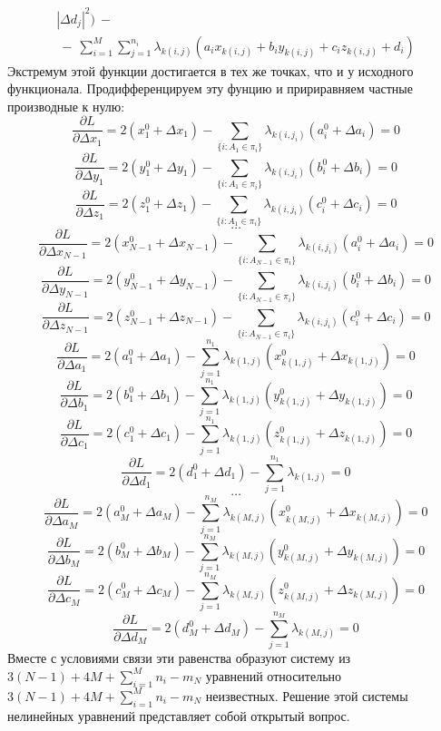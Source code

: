 \documentclass[a4paper,12pt, titlepage]{article}
\begin{document}
\begin{flushleft}
$$\begin{aligned}
				|\Delta d_{j}|^{2})~ - ~\\
				~ - ~\sum\limits_{i = 1}^{M} \sum\limits_{j = 1} ^ {n_{i}} \lambda_{k(i, j)}
				(a_{i} x_{k(i, j)} + b_{i} y_{k(i, j)} + c_{i} z_{k(i, j)} + d_{i})		
			\end{aligned}
		$$
		Экстремум этой функции достигается в тех же точках, что и у исходного функционала. Продифференцируем эту
		фунцию и пририравняем частные производные к нулю:
$$
    \frac{\partial L}{\partial \Delta x_{1}} = 2 (x^{0}_{1} + \Delta x_{1}) - 
    \sum\limits_{\{i : A_{1} \in \pi_{i}\}} \lambda_{k(i, j_{i})} (a^{0}_{i} + \Delta a_{i}) = 0
$$
$$
    \frac{\partial L}{\partial \Delta y_{1}} = 2 (y^{0}_{1} + \Delta y_{1}) - 
    \sum\limits_{\{i : A_{1} \in \pi_{i}\}} \lambda_{k(i, j_{i})} (b^{0}_{i} + \Delta b_{i}) = 0
$$
$$
    \frac{\partial L}{\partial \Delta z_{1}} = 2 (z^{0}_{1} + \Delta z_{1}) - 
    \sum\limits_{\{i : A_{1} \in \pi_{i}\}} \lambda_{k(i, j_{i})} (c^{0}_{i} + \Delta c_{i}) = 0
$$
$$
    \ldots
$$
$$
    \frac{\partial L}{\partial \Delta x_{N - 1}} = 2 (x^{0}_{N - 1} + \Delta x_{N - 1}) - 
    \sum\limits_{\{i : A_{N - 1} \in \pi_{i}\}} \lambda_{k(i, j_{i})} (a^{0}_{i} + \Delta a_{i}) = 0
$$
$$
    \frac{\partial L}{\partial \Delta y_{N - 1}} = 2 (y^{0}_{N - 1} + \Delta y_{N - 1}) - 
    \sum\limits_{\{i : A_{N - 1} \in \pi_{i}\}} \lambda_{k(i, j_{i})} (b^{0}_{i} + \Delta b_{i}) = 0
$$
$$
    \frac{\partial L}{\partial \Delta z_{N - 1}} = 2 (z^{0}_{N - 1} + \Delta z_{N - 1}) - 
    \sum\limits_{\{i : A_{N - 1} \in \pi_{i}\}} \lambda_{k(i, j_{i})} (c^{0}_{i} + \Delta c_{i}) = 0
$$
$$
    \frac{\partial L}{\partial \Delta a_{1}} = 2 (a^{0}_{1} + \Delta a_{1}) - 
    \sum\limits_{j = 1}^{n_{1}} \lambda_{k(1, j)} (x^{0}_{k(1, j)} + \Delta x_{k(1, j)}) = 0
$$
$$
    \frac{\partial L}{\partial \Delta b_{1}} = 2 (b^{0}_{1} + \Delta b_{1}) - 
    \sum\limits_{j = 1}^{n_{1}} \lambda_{k(1, j)} (y^{0}_{k(1, j)} + \Delta y_{k(1, j)}) = 0
$$
$$
    \frac{\partial L}{\partial \Delta c_{1}} = 2 (c^{0}_{1} + \Delta c_{1}) - 
    \sum\limits_{j = 1}^{n_{1}} \lambda_{k(1, j)} (z^{0}_{k(1, j)} + \Delta z_{k(1, j)}) = 0
$$
$$
    \frac{\partial L}{\partial \Delta d_{1}} = 2 (d^{0}_{1} + \Delta d_{1}) - 
    \sum\limits_{j = 1}^{n_{1}} \lambda_{k(1, j)} = 0
$$
$$
    \ldots
$$
$$
    \frac{\partial L}{\partial \Delta a_{M}} = 2 (a^{0}_{M} + \Delta a_{M}) - 
    \sum\limits_{j = 1}^{n_{M}} \lambda_{k(M, j)} (x^{0}_{k(M, j)} + \Delta x_{k(M, j)}) = 0
$$
$$
    \frac{\partial L}{\partial \Delta b_{M}} = 2 (b^{0}_{M} + \Delta b_{M}) - 
    \sum\limits_{j = 1}^{n_{M}} \lambda_{k(M, j)} (y^{0}_{k(M, j)} + \Delta y_{k(M, j)}) = 0
$$
$$
    \frac{\partial L}{\partial \Delta c_{M}} = 2 (c^{0}_{M} + \Delta c_{M}) - 
    \sum\limits_{j = 1}^{n_{M}} \lambda_{k(M, j)} (z^{0}_{k(M, j)} + \Delta z_{k(M, j)}) = 0
$$
$$
    \frac{\partial L}{\partial \Delta d_{M}} = 2 (d^{0}_{M} + \Delta d_{M}) - 
    \sum\limits_{j = 1}^{n_{M}} \lambda_{k(M, j)} = 0
$$
		Вместе с условиями связи эти равенства образуют систему из 
		$3 (N - 1) + 4 M + \sum\limits_{i = 1}^{M}n_{i} - m_{N}$ уравнений относительно
		$3 (N - 1) + 4 M + \sum\limits_{i = 1}^{M}n_{i} - m_{N}$ неизвестных. Решение этой системы нелинейных
		уравнений представляет собой открытый вопрос.
	\end{flushleft}	
\end{document}
